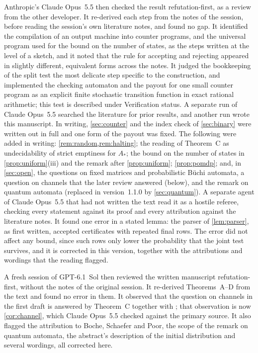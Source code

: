 \documentclass[11pt]{article}
\theoremstyle{plain}
\theoremstyle{definition}
\theoremstyle{remark}
\begin{document}
Anthropic's Claude Opus~5.5 then checked the result refutation-first, as a review from the other developer. It re-derived each step from the notes of the session, before reading the session's own literature notes, and found no gap. It identified the compilation of an output machine into counter programs, and the universal program used for the bound on the number of states, as the steps written at the level of a sketch, and it noted that the rule for accepting and rejecting appeared in slightly different, equivalent forms across the notes. It judged the bookkeeping of the split test the most delicate step specific to the construction, and implemented the checking automaton and the payout for one small counter program as an explicit finite stochastic transition function in exact rational arithmetic; this test is described under Verification status. A separate run of Claude Opus~5.5 searched the literature for prior results, and another run wrote this manuscript. In writing, \cref{sec:counter} and the index check of \cref{sec:binary} were written out in full and one form of the payout was fixed. The following were added in writing: \cref{rem:random,rem:halting}; the reading of Theorem~C as undecidability of strict emptiness for $A_*$; the bound on the number of states in \cref{prop:uniform}(iii) and the remark after \cref{prop:uniform}; \cref{prop:pomdp}; and, in \cref{sec:open}, the questions on fixed matrices and probabilistic B\"uchi automata, a question on channels that the later review answered (below), and the remark on quantum automata (replaced in version~1.1.0 by \cref{sec:quantum}). A separate agent of Claude Opus~5.5 that had not written the text read it as a hostile referee, checking every statement against its proof and every attribution against the literature notes. It found one error in a stated lemma: the parser of \cref{lem:parser}, as first written, accepted certificates with repeated final rows. The error did not affect any bound, since such rows only lower the probability that the joint test survives, and it is corrected in this version, together with the attributions and wordings that the reading flagged.

A fresh session of GPT-6.1~Sol then reviewed the written manuscript refutation-first, without the notes of the original session. It re-derived Theorems~A--D from the text and found no error in them. It observed that the question on channels in the first draft is answered by Theorem~C together with \cite[Theorem~1]{EPG18}; that observation is now \cref{cor:channel}, which Claude Opus~5.5 checked against the primary source. It also flagged the attribution to Boche, Schaefer and Poor, the scope of the remark on quantum automata, the abstract's description of the initial distribution and several wordings, all corrected here.
\end{document}

